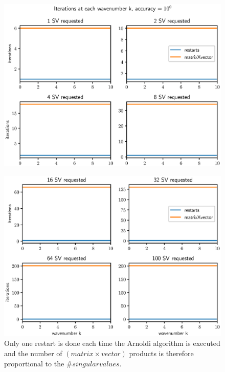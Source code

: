 \documentclass[a4paper, oneside]{thirdparty_stylesheets/discothesis}
\begin{document}
\begin{figure} [H]
	\centering
	\includegraphics[width=0.9\columnwidth]{figures/arnoldi_iter_1e2_1.eps}
	\label{fig:arnoldi_iter_1e2_1}
\end{figure}
\begin{figure} [H]
	\centering
	\includegraphics[width=0.9\columnwidth]{figures/arnoldi_iter_1e2_2.eps}
	\caption{
		Only one restart is done each time the Arnoldi algorithm is executed and the number of $(matrix\times vector)$ products is therefore proportional to the $\#singularvalues$.
	}
	\label{fig:arnoldi_iter_1e2_2}
\end{figure}
\end{document}
